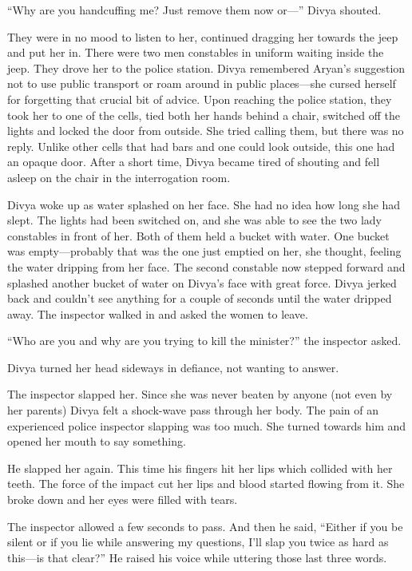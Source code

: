 “Why are you handcuffing me? Just remove them now or—” Divya shouted.

They were in no mood to listen to her, continued dragging her towards the jeep
and put her in. There were two men constables in uniform waiting inside the
jeep. They drove her to the police station. Divya remembered Aryan's suggestion
not to use public transport or roam around in public places—she cursed herself
for forgetting that crucial bit of advice. Upon reaching the police station,
they took her to one of the cells, tied both her hands behind a chair, switched
off the lights and locked the door from outside. She tried calling them, but
there was no reply. Unlike other cells that had bars and one could look outside,
this one had an opaque door. After a short time, Divya became tired of shouting
and fell asleep on the chair in the interrogation room.

Divya woke up as water splashed on her face. She had no idea how long she had
slept. The lights had been switched on, and she was able to see the two lady
constables in front of her. Both of them held a bucket with water. One bucket
was empty—probably that was the one just emptied on her, she thought, feeling
the water dripping from her face. The second constable now stepped forward and
splashed another bucket of water on Divya's face with great force. Divya jerked
back and couldn't see anything for a couple of seconds until the water dripped
away. The inspector walked in and asked the women to leave.

“Who are you and why are you trying to kill the minister?” the inspector asked.

Divya turned her head sideways in defiance, not wanting to answer.

The inspector slapped her. Since she was never beaten by anyone (not even by her
parents) Divya felt a shock-wave pass through her body. The pain of an
experienced police inspector slapping was too much. She turned towards him and
opened her mouth to say something.

He slapped her again. This time his fingers hit her lips which collided with her
teeth. The force of the impact cut her lips and blood started flowing from it.
She broke down and her eyes were filled with tears.

The inspector allowed a few seconds to pass. And then he said, “Either if you be
silent or if you lie while answering my questions, I'll slap you twice as hard
as this—is that clear?” He raised his voice while uttering those last three
words.

